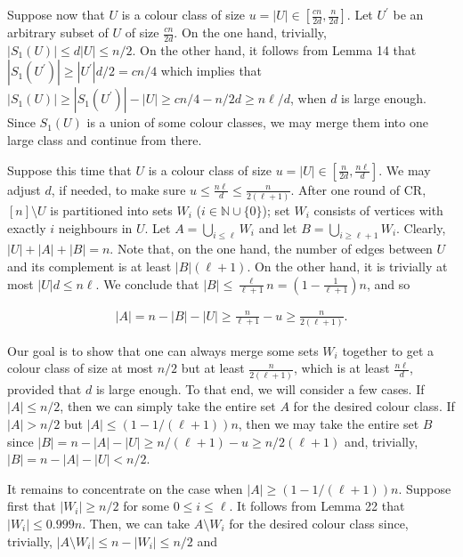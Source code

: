 Suppose now that $U$ is a colour class of size $u=|U|\in[\frac{cn}{2d},\frac{n}{2d}]$. Let $U^{\prime}$ be an arbitrary subset of $U$ of size $\frac{cn}{2d}$. On the one hand, trivially, $|S_{1}(U)|\leq d|U|\leq n/2$. On the other hand, it follows from Lemma 14 that $|S_{1}(U^{\prime})|\geq|U^{\prime}|d/2=cn/4$ which implies that $|S_{1}(U)|\geq|S_{1}(U^{\prime})|-|U|\geq cn/4-n/2d\geq n\ell/d$, when $d$ is large enough. Since $S_{1}(U)$ is a union of some colour classes, we may merge them into one large class and continue from there.\par




Suppose this time that $U$ is a colour class of size $u=|U|\in[\frac{n}{2d},\frac{n\ell}{d}]$. We may adjust $d$, if needed, to make sure $u\leq\frac{n\ell}{d}\leq\frac{n}{2(\ell+1)}$. After one round of CR, $[n]\setminus U$ is partitioned into sets $W_{i}$ ($i\in\mathbb{N}\cup\{0\}$); set $W_{i}$ consists of vertices with exactly $i$ neighbours in $U$. Let $A=\bigcup_{i\leq\ell}W_{i}$ and let $B=\bigcup_{i\geq\ell+1}W_{i}$. Clearly, $|U|+|A|+|B|=n$. Note that, on the one hand, the number of edges between $U$ and its complement is at least $|B|(\ell+1)$. On the other hand, it is trivially at most $|U|d\leq n\ell$. We conclude that
$|B|\leq\frac{\ell}{\ell+1}n=\left(1-\frac{1}{\ell+1}\right)n$,
and so\par


\[\begin{gathered}
|A|=n-|B|-|U|\geq\frac{n}{\ell+1}-u\geq\frac{n}{2(\ell+1)}.
\end{gathered}\]




Our goal is to show that one can always merge some sets $W_{i}$ together to get a colour class of size at most $n/2$ but at least $\frac{n}{2(\ell+1)}$, which is at least $\frac{n\ell}{d}$, provided that $d$ is large enough. To that end, we will consider a few cases. If $|A|\leq n/2$, then we can simply take the entire set $A$ for the desired colour class. If $|A|>n/2$ but $|A|\leq(1-1/(\ell+1))n$, then we may take the entire set $B$ since $|B|=n-|A|-|U|\geq n/(\ell+1)-u\geq n/2(\ell+1)$ and, trivially, $|B|=n-|A|-|U|<n/2$.\par




It remains to concentrate on the case when $|A|\geq(1-1/(\ell+1))n$. Suppose first that $|W_{i}|\geq n/2$ for some $0\leq i\leq\ell$. It follows from Lemma 22 that $|W_{i}|\leq 0.999n$. Then, we can take $A\setminus W_{i}$ for the desired colour class since, trivially, $|A\setminus W_{i}|\leq n-|W_{i}|\leq n/2$ and\par


